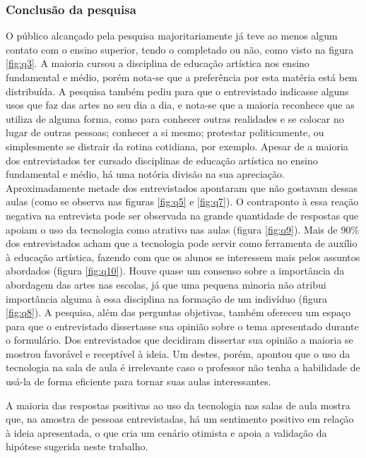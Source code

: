 \documentclass[12pt, a4paper]{article}
\begin{document}
\subsubsection{Conclusão da pesquisa}
O público alcançado pela pesquisa majoritariamente já teve ao menos algum contato com o ensino superior, tendo o completado ou não, como visto na figura \ref{fig:q3}. A maioria cursou a disciplina de educação artística nos ensino fundamental e médio, porém nota-se que a preferência por esta matéria está bem distribuída. A pesquisa também pediu para que o entrevistado indicasse alguns usos que faz das artes no seu dia a dia, e nota-se que a maioria reconhece que as utiliza de alguma forma, como para conhecer outras realidades e se colocar no lugar de outras pessoas; conhecer a si mesmo; protestar politicamente, ou simplesmente se distrair da rotina cotidiana, por exemplo.
Apesar de a maioria dos entrevistados ter cursado disciplinas de educação artística no ensino fundamental e médio, há uma notória divisão na sua apreciação. Aproximadamente metade dos entrevistados apontaram que não gostavam dessas aulas (como se observa nas figuras \ref{fig:q5} e \ref{fig:q7}).
O contraponto à essa reação negativa na entrevista pode ser observada na grande quantidade de respostas que apoiam o uso da tecnologia como atrativo nas aulas (figura \ref{fig:q9}).
Mais de 90\% dos entrevistados acham que a tecnologia pode servir como ferramenta de auxílio à educação artística, 
fazendo com que os alunos se interessem mais pelos assuntos abordados (figura \ref{fig:q10}). 
Houve quase um consenso sobre a importância da abordagem das artes nas escolas, já que uma pequena minoria não atribui importância alguma à essa disciplina na formação de um indivíduo (figura \ref{fig:q8}). A pesquisa, além das perguntas objetivas, também ofereceu um espaço para que o entrevistado dissertasse sua opinião sobre o tema apresentado durante o formulário. Dos entrevistados que decidiram dissertar sua opinião a maioria se mostrou favorável e receptível à ideia. Um destes, porém, apontou que o uso da tecnologia na sala de aula é irrelevante caso o professor não tenha a habilidade de usá-la de forma eficiente para tornar suas aulas interessantes.

A maioria das respostas positivas ao uso da tecnologia nas salas de aula mostra que, na amostra de pessoas entrevistadas, há um sentimento positivo em relação à ideia apresentada, o que cria um cenário otimista e apoia a validação da hipótese sugerida neste trabalho.

\newpage
\end{document}
